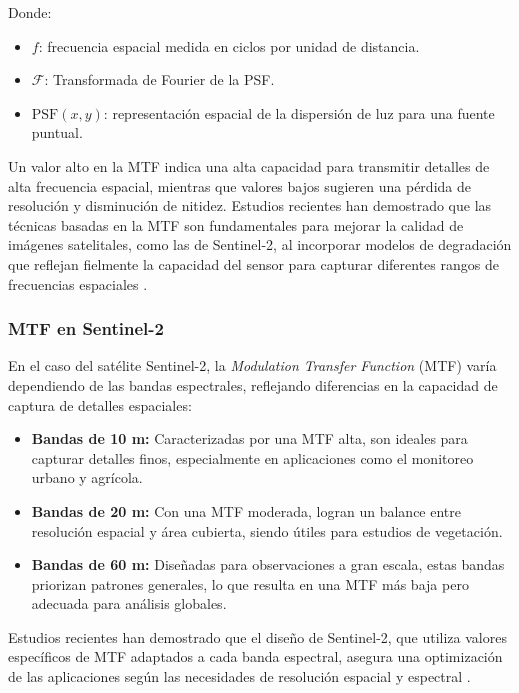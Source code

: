             Donde:
            \begin{itemize}
                \item \( f \): frecuencia espacial medida en ciclos por unidad de distancia.
                \item \( \mathcal{F} \): Transformada de Fourier de la PSF.
                \item \( \text{PSF}(x, y) \): representación espacial de la dispersión de luz para una fuente puntual.
            \end{itemize}
            
            Un valor alto en la MTF indica una alta capacidad para transmitir detalles de alta frecuencia espacial, mientras que valores bajos sugieren una pérdida de resolución y disminución de nitidez. Estudios recientes han demostrado que las técnicas basadas en la MTF son fundamentales para mejorar la calidad de imágenes satelitales, como las de Sentinel-2, al incorporar modelos de degradación que reflejan fielmente la capacidad del sensor para capturar diferentes rangos de frecuencias espaciales \autocite{hubble2021single}.
            
        \subsubsection{MTF en Sentinel-2}

            En el caso del satélite Sentinel-2, la \textit{Modulation Transfer Function} (MTF) varía dependiendo de las bandas espectrales, reflejando diferencias en la capacidad de captura de detalles espaciales:
            
            \begin{itemize}
                \item \textbf{Bandas de 10 m:} Caracterizadas por una MTF alta, son ideales para capturar detalles finos, especialmente en aplicaciones como el monitoreo urbano y agrícola.
                \item \textbf{Bandas de 20 m:} Con una MTF moderada, logran un balance entre resolución espacial y área cubierta, siendo útiles para estudios de vegetación.
                \item \textbf{Bandas de 60 m:} Diseñadas para observaciones a gran escala, estas bandas priorizan patrones generales, lo que resulta en una MTF más baja pero adecuada para análisis globales.
            \end{itemize}
            
            Estudios recientes han demostrado que el diseño de Sentinel-2, que utiliza valores específicos de MTF adaptados a cada banda espectral, asegura una optimización de las aplicaciones según las necesidades de resolución espacial y espectral \autocite{donike2022deep}.
            
